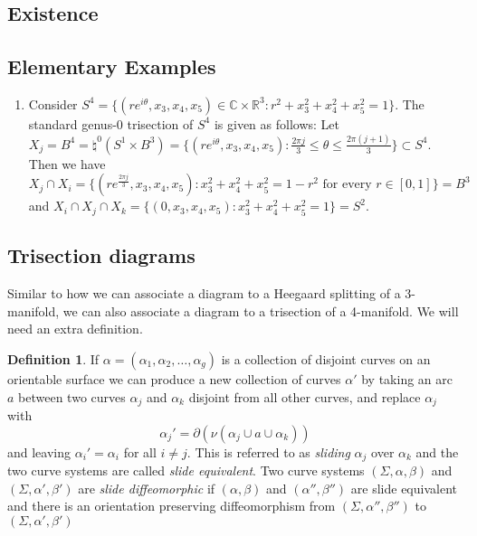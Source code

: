 \documentclass{amsart}
\theoremstyle{definition}
\newtheorem{definition}[theorem]{Definition}
\begin{document}
\subsection{Existence}

\subsection{Elementary Examples}
\begin{enumerate}
\item Consider $S^{4} = \{(re^{i\theta}, x_{3}, x_{4}, x_{5}) \in \mathbb{C} \times \mathbb{R}^{3} : r^{2} + x_{3}^{2} + x_{4}^{2} + x_{5}^{2}= 1\}.$ The standard genus-0 trisection of $S^{4}$ is given as follows: Let $X_{j} = B^{4} = \natural^{0}(S^{1} \times B^{3}) = \{(re^{i\theta}, x_{3}, x_{4}, x_{5}):  \frac{2\pi j}{3} \leq \theta \leq \frac{2\pi(j + 1)}{3} \} \subset S^{4}.$ Then we have $X_{j} \cap X_{i} = \{(re^{\frac{2\pi j}{3}}, x_{3}, x_{4}, x_{5}): x_{3}^{2} + x_{4}^{2} + x_{5}^{2} = 1 - r^{2} \text{ for every } r \in [0, 1]\} = B^{3}$ and $X_{i} \cap X_{j} \cap X_{k} = \{(0, x_{3}, x_{4}, x_{5}) : x_{3}^{2} + x_{4}^{2} + x_{5}^{2} = 1 \} = S^{2}.$
\end{enumerate}

\subsection{Trisection diagrams}
Similar to how we can associate a diagram to a Heegaard splitting of a 3-manifold, we can also associate a diagram to a trisection of a 4-manifold. We will need an extra definition.
\begin{definition}
If $\alpha = (\alpha_{1}, \alpha_{2}, \hdots, \alpha_{g})$ is a collection of disjoint curves on an orientable surface we can produce a new collection of curves $\alpha'$ by taking an arc $a$ between two curves $\alpha_{j}$ and $\alpha_{k}$ disjoint from all other curves, and replace $\alpha_{j}$ with $$\alpha_{j}' = \partial(\nu(\alpha_{j} \cup a \cup \alpha_{k}))$$ and leaving $\alpha_{i}' = \alpha_{i}$ for all $i \neq j.$ This is referred to as \textit{sliding} $\alpha_{j}$ over $\alpha_{k}$ and the two curve systems are called \textit{slide equivalent}. Two curve systems $(\Sigma, \alpha, \beta)$ and $(\Sigma, \alpha', \beta')$ are \textit{slide diffeomorphic} if $(\alpha, \beta)$ and $(\alpha'', \beta'')$ are slide equivalent and there is an orientation preserving diffeomorphism from $(\Sigma, \alpha'', \beta'')$ to $(\Sigma, \alpha', \beta')$
\end{definition} 
\end{document}
